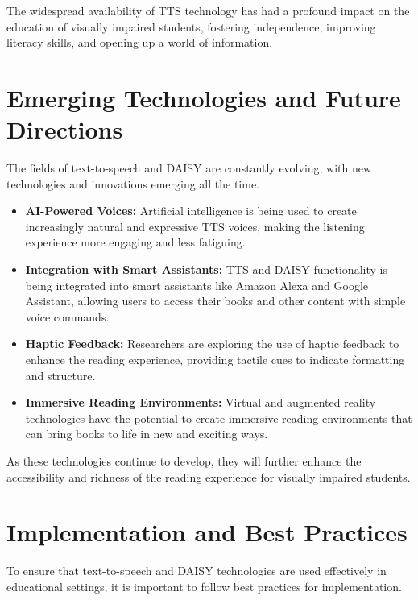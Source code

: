 The widespread availability of TTS technology has had a profound impact on the education of visually impaired students, fostering independence, improving literacy skills, and opening up a world of information.

\section{Emerging Technologies and Future Directions}

The fields of text-to-speech and DAISY are constantly evolving, with new technologies and innovations emerging all the time.

\begin{itemize}
	\item \textbf{AI-Powered Voices:} Artificial intelligence is being used to create increasingly natural and expressive TTS voices, making the listening experience more engaging and less fatiguing.
	\item \textbf{Integration with Smart Assistants:} TTS and DAISY functionality is being integrated into smart assistants like Amazon Alexa and Google Assistant, allowing users to access their books and other content with simple voice commands.
	\item \textbf{Haptic Feedback:} Researchers are exploring the use of haptic feedback to enhance the reading experience, providing tactile cues to indicate formatting and structure.
	\item \textbf{Immersive Reading Environments:} Virtual and augmented reality technologies have the potential to create immersive reading environments that can bring books to life in new and exciting ways.
\end{itemize}

As these technologies continue to develop, they will further enhance the accessibility and richness of the reading experience for visually impaired students.

\section{Implementation and Best Practices}

To ensure that text-to-speech and DAISY technologies are used effectively in educational settings, it is important to follow best practices for implementation.

